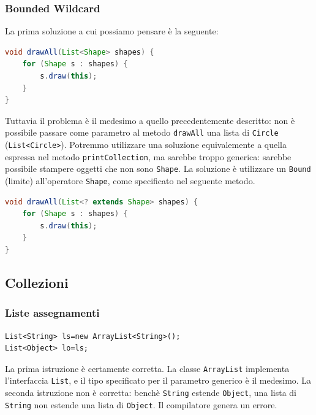 \documentclass{article}
\begin{document}
\subsubsection{Bounded Wildcard}

La prima soluzione a cui possiamo pensare \`e la seguente:
\begin{lstlisting}[language=Java]
void drawAll(List<Shape> shapes) { 
    for (Shape s : shapes) {
        s.draw(this); 
    }
}
\end{lstlisting}
Tuttavia il problema \`e il medesimo a quello precedentemente descritto: non \`e possibile passare come parametro al metodo \texttt{drawAll} una lista di \texttt{Circle} (\texttt{List<Circle>}). Potremmo utilizzare una soluzione equivalemente a quella espressa nel metodo \texttt{printCollection}, ma sarebbe troppo generica: sarebbe possibile stampere oggetti che non sono \texttt{Shape}. La soluzione \`e utilizzare un \texttt{Bound} (limite) all'operatore \texttt{Shape}, come specificato nel seguente metodo.
\begin{lstlisting}[language=Java]
void drawAll(List<? extends Shape> shapes) { 
    for (Shape s : shapes) {
        s.draw(this); 
    }
}
\end{lstlisting}



\subsection{Collezioni}

\subsubsection{Liste assegnamenti}

\begin{lstlisting}
List<String> ls=new ArrayList<String>();
List<Object> lo=ls;
\end{lstlisting}

La prima istruzione \`e certamente corretta. La classe \texttt{ArrayList} implementa l'interfaccia \texttt{List}, e il tipo specificato per il parametro generico \`e il medesimo. La seconda istruzione non \`e corretta: bench\`e \texttt{String} estende \texttt{Object}, una lista di \texttt{String} non estende una lista di \texttt{Object}. Il compilatore genera un errore.
\end{document}
